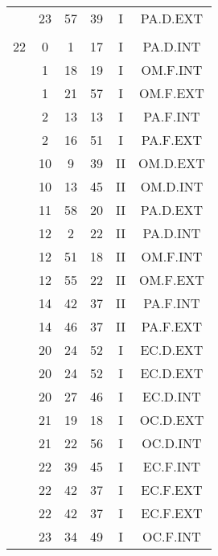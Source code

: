 \documentclass[12pt, a4paper]{article}
\begin{document}
\begin{multicols}{3}
{\begin{tabular}{c c c c c c}
	 	 	 	 & 23 & 57 & 39 & I & PA.D.EXT\\%
	 	 	 	 & & & & & \\%
	 	 	 	22 & 0 & 1 & 17 & I & PA.D.INT\\%
	 	 	 	 & 1 & 18 & 19 & I & OM.F.INT\\%
	 	 	 	 & 1 & 21 & 57 & I & OM.F.EXT\\%
	 	 	 	 & 2 & 13 & 13 & I & PA.F.INT\\%
	 	 	 	 & 2 & 16 & 51 & I & PA.F.EXT\\%
	 	 	 	 & 10 & 9 & 39 & II & OM.D.EXT\\%
	 	 	 	 & 10 & 13 & 45 & II & OM.D.INT\\%
	 	 	 	 & 11 & 58 & 20 & II & PA.D.EXT\\%
	 	 	 	 & 12 & 2 & 22 & II & PA.D.INT\\%
	 	 	 	 & 12 & 51 & 18 & II & OM.F.INT\\%
	 	 	 	 & 12 & 55 & 22 & II & OM.F.EXT\\%
	 	 	 	 & 14 & 42 & 37 & II & PA.F.INT\\%
	 	 	 	 & 14 & 46 & 37 & II & PA.F.EXT\\%
	 	 	 	 & 20 & 24 & 52 & I & EC.D.EXT\\%
	 	 	 	 & 20 & 24 & 52 & I & EC.D.EXT\\%
	 	 	 	 & 20 & 27 & 46 & I & EC.D.INT\\%
	 	 	 	 & 21 & 19 & 18 & I & OC.D.EXT\\%
	 	 	 	 & 21 & 22 & 56 & I & OC.D.INT\\%
	 	 	 	 & 22 & 39 & 45 & I & EC.F.INT\\%
	 	 	 	 & 22 & 42 & 37 & I & EC.F.EXT\\%
	 	 	 	 & 22 & 42 & 37 & I & EC.F.EXT\\%
	 	 	 	 & 23 & 34 & 49 & I & OC.F.INT\\%
	 	 \end{tabular}
 	}
\end{multicols}
\end{document}
